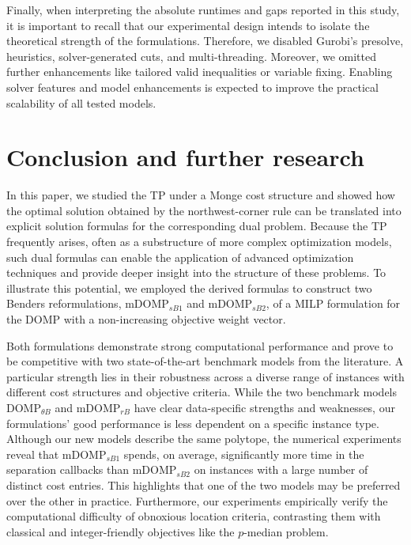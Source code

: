 \documentclass[letterpaper]{article}
\begin{document}
Finally, when interpreting the absolute runtimes and gaps reported in this study, it is important to recall that our experimental design intends to isolate the theoretical strength of the formulations. Therefore, we disabled Gurobi’s presolve, heuristics, solver-generated cuts, and multi-threading. Moreover, we omitted further enhancements like tailored valid inequalities or variable fixing. Enabling solver features and model enhancements is expected to improve the practical scalability of all tested models.


\section{Conclusion and further research}
\label{sec:conclusion}
In this paper, we studied the TP under a Monge cost structure and showed how the optimal solution obtained by the northwest-corner rule can be translated into explicit solution formulas for the corresponding dual problem. Because the TP frequently arises, often as a substructure of more complex optimization models, such dual formulas can enable the application of advanced optimization techniques and provide deeper insight into the structure of these problems. To illustrate this potential, we employed the derived formulas to construct two Benders reformulations, $\text{mDOMP}_{sB1}$ and $\text{mDOMP}_{sB2}$, of a MILP formulation for the DOMP with a non-increasing objective weight vector.

Both formulations demonstrate strong computational performance and prove to be competitive with two state-of-the-art benchmark models from the literature. A particular strength lies in their robustness across a diverse range of instances with different cost structures and objective criteria. While the two benchmark models $\text{DOMP}_{\theta B}$ and $\text{mDOMP}_{rB}$ have clear data-specific strengths and weaknesses, our formulations' good performance is less dependent on a specific instance type. Although our new models describe the same polytope, the numerical experiments reveal that $\text{mDOMP}_{sB1}$ spends, on average, significantly more time in the separation callbacks than $\text{mDOMP}_{sB2}$ on instances with a large number of distinct cost entries. This highlights that one of the two models may be preferred over the other in practice. Furthermore, our experiments empirically verify the computational difficulty of obnoxious location criteria, contrasting them with classical and integer-friendly objectives like the $p$-median problem.
\end{document}
